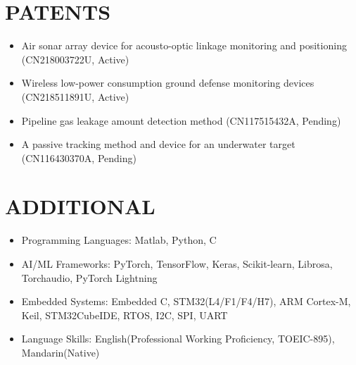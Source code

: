 \documentclass[a4paper,8pt]{article}
\begin{document}
\section{\textbf{PATENTS}}

\begin{minipage}[t]{\linewidth}
    \begin{itemize}[nosep,after=\strut, leftmargin=1em, itemsep=2pt]
        \item Air sonar array device for acousto-optic linkage monitoring and positioning (CN218003722U, Active)
        \item Wireless low-power consumption ground defense monitoring devices (CN218511891U, Active)
        \item Pipeline gas leakage amount detection method (CN117515432A, Pending)
        \item A passive tracking method and device for an underwater target
 (CN116430370A, Pending)
\\[2pt]
    \end{itemize}
\end{minipage}

\section{\textbf{ADDITIONAL}}

\begin{minipage}[t]{\linewidth}
    \begin{itemize}[nosep,after=\strut, leftmargin=1em, itemsep=2pt]
        \item Programming Languages: Matlab, Python, C
        \item AI/ML Frameworks: PyTorch, TensorFlow, Keras, Scikit-learn, Librosa, Torchaudio, PyTorch Lightning 
        \item Embedded Systems: Embedded C, STM32(L4/F1/F4/H7), ARM Cortex-M, Keil, STM32CubeIDE, RTOS, I2C, SPI, UART  
        \item Language Skills: English(Professional Working Proficiency, TOEIC-895), Mandarin(Native) \\
    \end{itemize}
\end{minipage}
\end{document}
